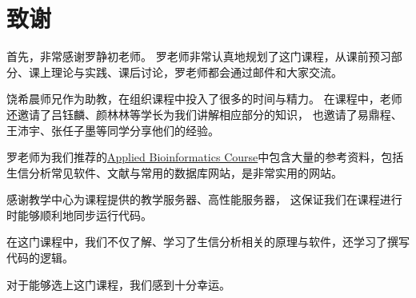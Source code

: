 \chapter*{致谢}

首先，非常感谢罗静初老师。
罗老师非常认真地规划了这门课程，从课前预习部分、课上理论与实践、课后讨论，罗老师都会通过邮件和大家交流。

饶希晨师兄作为助教，在组织课程中投入了很多的时间与精力。
在课程中，老师还邀请了吕钰麟、颜林林等学长为我们讲解相应部分的知识，
也邀请了易鼎程、王沛宇、张任子墨等同学分享他们的经验。

罗老师为我们推荐的\href{http://abc.gao-lab.org/}{Applied Bioinformatics Course}中包含大量的参考资料，包括生信分析常见软件、文献与常用的数据库网站，是非常实用的网站。

感谢教学中心为课程提供的教学服务器、高性能服务器，
这保证我们在课程进行时能够顺利地同步运行代码。

在这门课程中，我们不仅了解、学习了生信分析相关的原理与软件，还学习了撰写代码的逻辑。

对于能够选上这门课程，我们感到十分幸运。